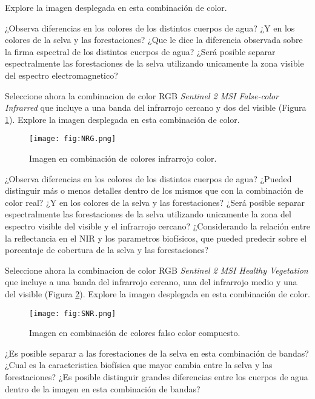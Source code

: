 Explore la imagen desplegada en esta combinación de color.

\begin{que}
    ¿Observa diferencias en los colores de los distintos cuerpos de agua? ¿Y en los colores de la selva y las forestaciones? ¿Que le dice la diferencia observada sobre la firma espectral de los distintos cuerpos de agua? ¿Será posible separar espectralmente las forestaciones de la selva utilizando unicamente la zona visible del espectro electromagnetico?
\end{que}

Seleccione ahora la combinacion de color RGB \emph{Sentinel 2 MSI False-color Infrarred} que incluye a una banda del infrarrojo cercano y dos del visible (Figura \ref{fig:NRG}). Explore la imagen desplegada en esta combinación de color.

\begin{figure}[h!]
    \centering
    \texttt{[image: fig:NRG.png]}
    \caption{Imagen en combinación de colores infrarrojo color.}
    \label{fig:NRG}
\end{figure}

\begin{que}
    ¿Observa diferencias en los colores de los distintos cuerpos de agua? ¿Pueded distinguir más o menos detalles dentro de los mismos que con la combinación de color real? ¿Y en los colores de la selva y las forestaciones? ¿Será posible separar espectralmente las forestaciones de la selva utilizando unicamente la zona del espectro visible del visible y el infrarrojo cercano? ¿Considerando la relación entre la reflectancia en el NIR y los parametros biofísicos, que pueded predecir sobre el porcentaje de cobertura de la selva y las forestaciones?
\end{que}

Seleccione ahora la combinacion de color RGB \emph{Sentinel 2 MSI Healthy Vegetation} que incluye a una banda del infrarrojo cercano, una del infrarrojo medio y una del visible (Figura \ref{fig:SNR}). Explore la imagen desplegada en esta combinación de color.

\begin{figure}[h!]
    \centering
    \texttt{[image: fig:SNR.png]}
    \caption{Imagen en combinación de colores falso color compuesto.}
    \label{fig:SNR}
\end{figure}


\begin{que}
    ¿Es posible separar a las forestaciones de la selva en esta combinación de bandas? ¿Cual es la caracteristica biofísica que mayor cambia entre la selva y las forestaciones? ¿Es posible distinguir grandes diferencias entre los cuerpos de agua dentro de la imagen en esta combinación de bandas?
\end{que}

